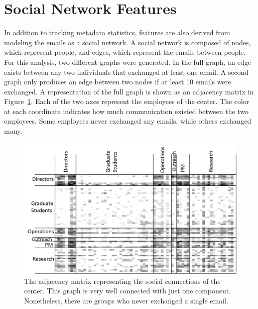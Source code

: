\documentclass[12pt]{report}
\begin{document}
\section{Social Network Features}
In addition to tracking metadata statistics, features are also derived from modeling the emails as a social network.
A social network is composed of nodes, which represent people, and edges, which represent the emails between people.
For this analysis, two different graphs were generated.
In the full graph, an edge exists between any two individuals that exchanged at least one email.
A second graph only produces an edge between two nodes if at least 10 emails were exchanged.
A representation of the full graph is shown as an adjacency matrix in Figure~\ref{fig:adj_matrix}.
Each of the two axes represent the employees of the center.
The color at each coordinate indicates how much communication existed between the two employees.
Some employees never exchanged any emails, while others exchanged many.

\begin{figure}[t]
    \centering
    \includegraphics[width=\columnwidth,trim={4mm .5mm 0mm 5mm},clip]{adj_matrix}
    \vspace{-17pt}
    \caption{The adjacency matrix representing the social connections of the center.  This graph is very well connected with just one component.  Nonetheless, there are groups who never exchanged a single email.}
    \label{fig:adj_matrix}
\end{figure}
\end{document}
